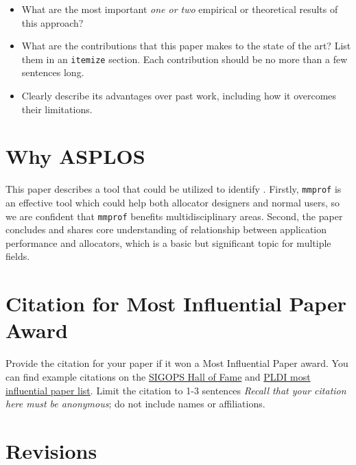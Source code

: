 \documentclass[pageno]{jpaper}
\newcommand{\MP}{\texttt{mmprof}}
\begin{document}
\begin{itemize}
  \item What are the most important \emph{one or two} empirical or theoretical
    results of this approach?
\end{itemize}

\begin{itemize}
  \item What are the contributions that this paper makes to the state of the
    art? List them in an \texttt{itemize} section. Each contribution should be no more than a few sentences long.
\end{itemize}

\begin{itemize}
  \item Clearly describe its advantages over past work, including how it overcomes their limitations.
\end{itemize}


\section{Why ASPLOS}
\label{sec:why-asplos}

This paper describes a tool that could be utilized to identify .
Firstly, \MP{} is an effective tool which could help both allocator designers and normal users, so we are confident that \MP{} benefits multidisciplinary areas. Second, the paper concludes and shares core understanding of relationship between application performance and allocators, which is a basic but significant topic for multiple fields.


\section{Citation for Most Influential Paper Award}
\label{sec:citation}

Provide the citation for your paper if it won a Most Influential
Paper award. You can find example citations
on the \href{https://www.sigops.org/awards/hof/}{SIGOPS Hall of Fame}
and \href{https://www.sigplan.org/Awards/PLDI/}{PLDI most influential
  paper list}.  Limit the citation to 1-3 sentences
\emph{Recall that your citation here must be anonymous}; do not include names or affiliations.


\section{Revisions}
\label{sec:revisions}
\end{document}

